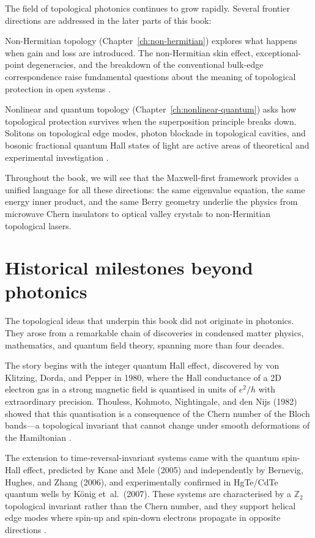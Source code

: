 The field of topological photonics continues to grow rapidly.
Several frontier directions are addressed in the later parts of this
book:

Non-Hermitian topology (Chapter~\ref{ch:non-hermitian}) explores what
happens when gain and loss are introduced.  The non-Hermitian skin
effect, exceptional-point degeneracies, and the breakdown of the
conventional bulk-edge correspondence raise fundamental questions about
the meaning of topological protection in open systems
\cite{ozawa2018topological}.

Nonlinear and quantum topology (Chapter~\ref{ch:nonlinear-quantum})
asks how topological protection survives when the superposition
principle breaks down.  Solitons on topological edge modes, photon
blockade in topological cavities, and bosonic fractional quantum Hall
states of light are active areas of theoretical and experimental
investigation \cite{price2022roadmap}.

Throughout the book, we will see that the Maxwell-first framework
provides a unified language for all these directions: the same
eigenvalue equation, the same energy inner product, and the same Berry
geometry underlie the physics from microwave Chern insulators to
optical valley crystals to non-Hermitian topological lasers.

\section{Historical milestones beyond photonics}
\label{sec:ch1-milestones-beyond}

The topological ideas that underpin this book did not originate in
photonics.  They arose from a remarkable chain of discoveries in
condensed matter physics, mathematics, and quantum field theory,
spanning more than four decades.

The story begins with the integer quantum Hall effect, discovered by
von Klitzing, Dorda, and Pepper in 1980, where the Hall conductance
of a 2D electron gas in a strong magnetic field is quantised in units
of $e^2/h$ with extraordinary precision.  Thouless, Kohmoto, Nightingale,
and den Nijs (1982) showed that this quantisation is a consequence of the
Chern number of the Bloch bands---a topological invariant that cannot
change under smooth deformations of the Hamiltonian
\cite{thouless1982quantized}.

The extension to time-reversal-invariant systems came with the quantum
spin-Hall effect, predicted by Kane and Mele (2005) and independently by
Bernevig, Hughes, and Zhang (2006), and experimentally confirmed in
HgTe/CdTe quantum wells by König et~al.\ (2007).  These systems are
characterised by a $\mathbb{Z}_2$ topological invariant rather than
the Chern number, and they support helical edge modes where spin-up
and spin-down electrons propagate in opposite directions
\cite{asbth2016berry,ozawa2018topological}.

